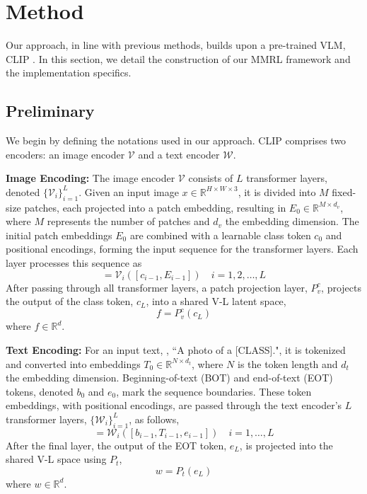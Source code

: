 \section{Method}
\label{sec:method}
Our approach, in line with previous methods, builds upon a pre-trained VLM, CLIP \cite{clip}. In this section, we detail the construction of our MMRL framework and the implementation specifics.

\subsection{Preliminary}
We begin by defining the notations used in our approach. CLIP comprises two encoders: an image encoder $\mathcal{V}$ and a text encoder $\mathcal{W}$.

\noindent \textbf{Image Encoding:} The image encoder $\mathcal{V}$ consists of $L$ transformer \cite{transformer} layers, denoted $\{\mathcal{V}_i\}_{i=1}^{L}$. Given an input image \( x \in \mathbb{R}^{H \times W \times 3} \), it is divided into \( M \) fixed-size patches, each projected into a patch embedding, resulting in \( E_0 \in \mathbb{R}^{M \times d_v} \), where $M$ represents the number of patches and $d_v$ the embedding dimension. The initial patch embeddings $E_0$ are combined with a learnable class token $c_0$ and positional encodings, forming the input sequence for the transformer layers. Each layer processes this sequence as
\begin{equation}
    [c_i, E_i] = \mathcal{V}_i([c_{i-1}, E_{i-1}]) \quad
    i = 1, 2, \ldots, L
    \nonumber
\end{equation}
After passing through all transformer layers, a patch projection layer, $P_v^c$, projects the output of the class token, $c_L$, into a shared V-L latent space,
\begin{equation}
    f = P_v^c(c_L)
    \nonumber
\end{equation}
where $f \in \mathbb{R}^{d}$.

\noindent \textbf{Text Encoding:} For an input text, \eg, ``A photo of a [CLASS].", it is tokenized and converted into embeddings $T_0 \in \mathbb{R}^{N \times d_t}$, where $N$ is the token length and $d_t$ the embedding dimension. Beginning-of-text (BOT) and end-of-text (EOT) tokens, denoted $b_0$ and $e_0$, mark the sequence boundaries. These token embeddings, with positional encodings, are passed through the text encoder's $L$ transformer layers, $\{\mathcal{W}_i\}_{i=1}^{L}$, as follows,
\begin{equation} 
    [b_i, T_i, e_i] = \mathcal{W}_i([b_{i-1}, T_{i-1}, e_{i-1}]) \quad i = 1, \ldots, L 
    \nonumber
\end{equation} 
After the final layer, the output of the EOT token, $e_L$, is projected into the shared V-L space using $P_t$,
\begin{equation} 
    w = P_{t}(e_{L}) \nonumber
\end{equation} 
where $w \in \mathbb{R}^{d}$.

